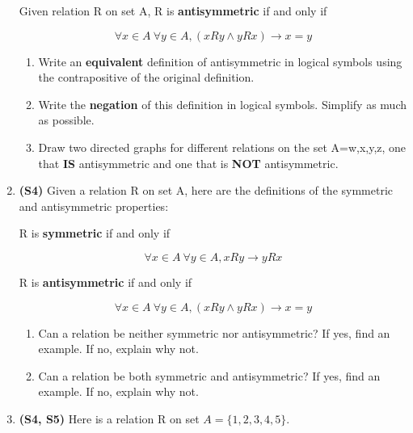 \documentclass[12pt]{article}
\begin{document}
\begin{enumerate}
Given relation R on set A, R is \textbf{antisymmetric} if and only if 

		\[\forall x \in A\ \forall y \in A, (xRy \land yRx) \rightarrow x = y \]

\begin{enumerate}
    \item Write an \textbf{equivalent} definition of antisymmetric in logical symbols using the contrapositive of the original definition.
	\item Write the \textbf{negation} of this definition in logical symbols. Simplify as much as possible.
	\item Draw two directed graphs for different relations on the set A={w,x,y,z}, one that \textbf{IS} antisymmetric and one that is \textbf{NOT} antisymmetric.
\end{enumerate}

\item
\textbf{(S4)} Given a relation R on set A, here are the definitions of the symmetric and antisymmetric properties:

R is \textbf{symmetric} if and only if

        \[\forall x \in A\ \forall y \in A, xRy \rightarrow yRx \]

R is \textbf{antisymmetric} if and only if 

		\[\forall x \in A\ \forall y \in A, (xRy \land yRx) \rightarrow x = y \]

\begin{enumerate}
    \item Can a relation be neither symmetric nor antisymmetric? If yes, find an example. If no, explain why not.
    \item Can a relation be both symmetric and antisymmetric? If yes, find an example. If no, explain why not.
\end{enumerate}		

\item \textbf{(S4, S5)} Here is a relation R on set $A=\{1,2,3,4,5\}$.

  \hfill


\end{enumerate}
\end{document}
